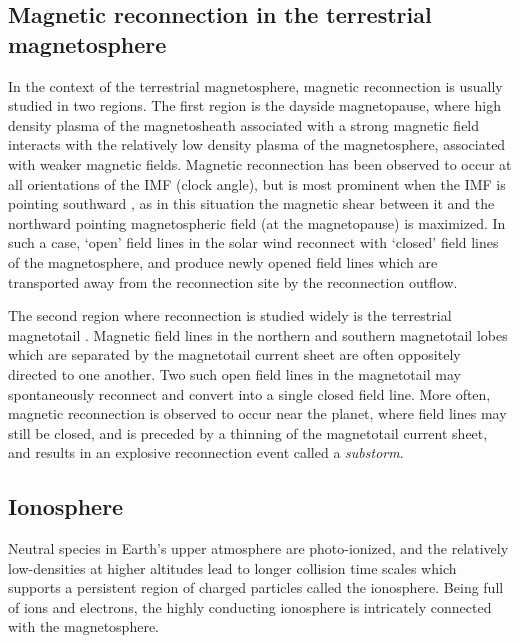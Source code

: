 \subsection{Magnetic reconnection in the terrestrial magnetosphere}
In the context of the terrestrial magnetosphere, magnetic reconnection is usually studied in two regions. The first region is the dayside magnetopause, where high density plasma of the magnetosheath associated with a strong magnetic field interacts with the relatively low density plasma of the magnetosphere, associated with weaker magnetic fields. Magnetic reconnection has been observed to occur at all orientations of the IMF (clock angle), but is most prominent when the IMF is pointing southward \cite{Swisdak2003DiamagneticMagnetopause}, as in this situation the magnetic shear between it and the northward pointing magnetospheric field (at the magnetopause) is maximized. In such a case, `open' field lines in the solar wind reconnect with `closed' field lines of the magnetosphere, and produce newly opened field lines which are transported away from the reconnection site by the reconnection outflow.

The second region where reconnection is studied widely is the terrestrial magnetotail \cite{Nakamura2006DynamicsReconnection}. Magnetic field lines in the northern and southern magnetotail lobes which are separated by the magnetotail current sheet are often oppositely directed to one another. Two such open field lines in the magnetotail may spontaneously reconnect and convert into a single closed field line. More often, magnetic reconnection is observed to occur near the planet, where field lines may still be closed, and is preceded by a thinning of the magnetotail current sheet, and results in an explosive reconnection event called a \emph{substorm}. 

\subsection{Ionosphere}
Neutral species in Earth's upper atmosphere are photo-ionized, and the relatively low-densities at higher altitudes lead to longer collision time scales which supports a persistent region of charged particles called the ionosphere. Being full of ions and electrons, the highly conducting ionosphere is intricately connected with the magnetosphere.


